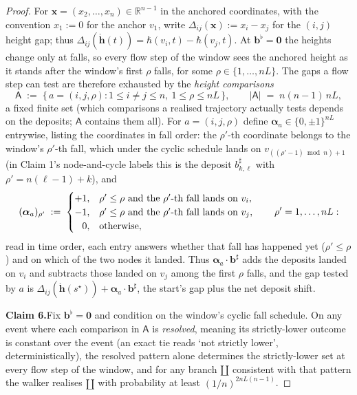 \documentclass[11pt]{article}
\theoremstyle{definition}
\begin{document}
\begin{proof}
\smallskip\noindent For $\mathbf{x} = (x_2,\ldots,x_n)\in\mathbb{R}^{n-1}$ in the anchored coordinates, with the convention $x_1 := 0$ for the anchor $v_1$, write $\Delta_{ij}(\mathbf{x}) := x_i - x_j$ for the $(i,j)$ height gap; thus $\Delta_{ij}(\mathring{\mathbf{h}}(t)) = \hbar(v_i,t)-\hbar(v_j,t)$. At $\mathbf{b}^{\flat}=\mathbf{0}$ the heights change only at falls, so every flow step of the window sees the anchored height as it stands after the window's first $\rho$ falls, for some $\rho\in\{1,\ldots,nL\}$. The gaps a flow step can test are therefore exhausted by the \emph{height comparisons}
\[
  \mathsf{A} \;:=\; \bigl\{\,a = (i,j,\rho) : 1\leq i\neq j\leq n,\ 1\leq\rho\leq nL\,\bigr\},
  \qquad |\mathsf{A}| \;=\; n(n-1)\,nL,
\]
a fixed finite set (which comparisons a realised trajectory actually tests depends on the deposits; $\mathsf{A}$ contains them all). For $a = (i,j,\rho)$ define $\boldsymbol{\alpha}_a\in\{0,\pm1\}^{nL}$ entrywise, listing the coordinates in fall order: the $\rho'$-th coordinate belongs to the window's $\rho'$-th fall, which under the cyclic schedule lands on $v_{((\rho'-1)\bmod n)+1}$ (in Claim 1's node-and-cycle labels this is the deposit $b^{\sharp}_{k,\ell}$ with $\rho' = n(\ell-1)+k$), and
\[
  (\boldsymbol{\alpha}_a)_{\rho'} \;:=\;
  \begin{cases}
    +1, & \rho'\leq\rho \text{ and the } \rho'\text{-th fall lands on } v_i,\\
    -1, & \rho'\leq\rho \text{ and the } \rho'\text{-th fall lands on } v_j,\\
    \hphantom{+}0, & \text{otherwise},
  \end{cases}
  \qquad \rho' = 1,\ldots,nL:
\]
read in time order, each entry answers whether that fall has happened yet ($\rho'\leq\rho$) and on which of the two nodes it landed. Thus $\boldsymbol{\alpha}_a\cdot\mathbf{b}^{\sharp}$ adds the deposits landed on $v_i$ and subtracts those landed on $v_j$ among the first $\rho$ falls, and the gap tested by $a$ is $\Delta_{ij}(\mathring{\mathbf{h}}(s^{\star})) + \boldsymbol{\alpha}_a\cdot\mathbf{b}^{\sharp}$, the start's gap plus the net deposit shift.

\smallskip\noindent\textbf{Claim 6.}\quad Fix $\mathbf{b}^{\flat}=\mathbf{0}$ and condition on the window's cyclic fall schedule. On any event where each comparison in $\mathsf{A}$ is \emph{resolved}, meaning its strictly-lower outcome is constant over the event (an exact tie reads `not strictly lower', deterministically), the resolved pattern alone determines the strictly-lower set at every flow step of the window, and for any branch $\amalg$ consistent with that pattern the walker realises $\amalg$ with probability at least $(1/n)^{2nL(n-1)}$.


\end{proof}
\end{document}

